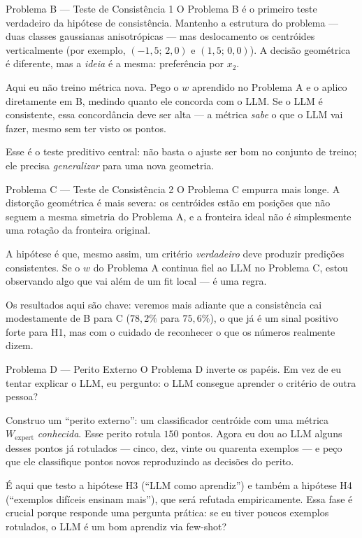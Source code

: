 \documentclass[aspectratio=169,10pt]{beamer}
\begin{document}
\begin{frame}{Problema B --- Teste de Consist\^encia 1}
  \small
  O Problema B \'e o primeiro teste verdadeiro da hip\'otese de consist\^encia. Mantenho a estrutura
  do problema --- duas classes gaussianas anisotr\'opicas --- mas deslocamento os centr\'oides verticalmente
  (por exemplo, $(-1{,}5;\,2{,}0)$ e $(1{,}5;\,0{,}0)$). A decis\~ao geom\'etrica \'e diferente, mas a
  \emph{ideia} \'e a mesma: prefer\^encia por $x_2$.
  \medskip

  Aqui eu n\~ao treino m\'etrica nova. Pego o $w$ aprendido no Problema A e o aplico diretamente em B,
  medindo quanto ele concorda com o LLM. Se o LLM \'e consistente, essa concord\^ancia deve ser alta ---
  a m\'etrica \emph{sabe} o que o LLM vai fazer, mesmo sem ter visto os pontos.
  \medskip

  Esse \'e o teste preditivo central: n\~ao basta o ajuste ser bom no conjunto de treino; ele precisa
  \emph{generalizar} para uma nova geometria.
\end{frame}

\begin{frame}{Problema C --- Teste de Consist\^encia 2}
  \small
  O Problema C empurra mais longe. A distor\c{c}\~ao geom\'etrica \'e mais severa: os centr\'oides est\~ao
  em posi\c{c}\~oes que n\~ao seguem a mesma simetria do Problema A, e a fronteira ideal n\~ao \'e simplesmente
  uma rota\c{c}\~ao da fronteira original.
  \medskip

  A hip\'otese \'e que, mesmo assim, um crit\'erio \emph{verdadeiro} deve produzir predi\c{c}\~oes
  consistentes. Se o $w$ do Problema A continua fiel ao LLM no Problema C, estou observando algo que
  vai al\'em de um fit local --- \'e uma regra.
  \medskip

  Os resultados aqui s\~ao chave: veremos mais adiante que a consist\^encia cai modestamente de B para C
  ($78{,}2\%$ para $75{,}6\%$), o que j\'a \'e um sinal positivo forte para H1, mas com o cuidado de
  reconhecer o que os n\'umeros realmente dizem.
\end{frame}

\begin{frame}{Problema D --- Perito Externo}
  \small
  O Problema D inverte os pap\'eis. Em vez de eu tentar explicar o LLM, eu pergunto: o LLM consegue
  aprender o crit\'erio de outra pessoa?
  \medskip

  Construo um ``perito externo'': um classificador centr\'oide com uma m\'etrica $W_{\text{expert}}$
  \emph{conhecida}. Esse perito rotula $150$ pontos. Agora eu dou ao LLM alguns desses pontos j\'a
  rotulados --- cinco, dez, vinte ou quarenta exemplos --- e pe\c{c}o que ele classifique pontos novos
  reproduzindo as decis\~oes do perito.
  \medskip

  \'E aqui que testo a hip\'otese H3 (``LLM como aprendiz'') e tamb\'em a hip\'otese H4 (``exemplos
  dif\'iceis ensinam mais''), que ser\'a refutada empiricamente. Essa fase \'e crucial porque responde
  uma pergunta pr\'atica: se eu tiver poucos exemplos rotulados, o LLM \'e um bom aprendiz via few-shot?
\end{frame}
\end{document}

